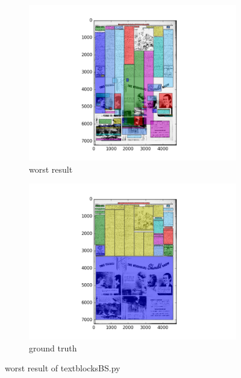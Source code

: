 \documentclass[a4paper,10pt]{article}
\begin{document}
					\begin{figure}
					\centering
					\begin{subfigure}{.5\textwidth}
					  \centering
					  \includegraphics[width=10cm]
					{textblocksBS.py.worst.png}
					  \caption{worst result}
					  \label{fig:sub1}
					\end{subfigure}%
					\begin{subfigure}{.5\textwidth}
					  \centering
					  \includegraphics[width=10cm]
					{textblocksBS.py.gt.worst.png}
					  \caption{ground truth}
					  \label{fig:sub2}
					\end{subfigure}
					\caption
					{worst result of textblocksBS.py}
					\label{fig:test}
					\end{figure}
					
\end{document}
